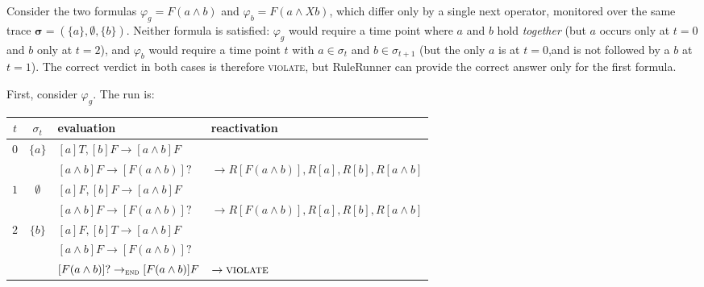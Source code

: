 Consider the two formulas $\varphi_g = F(a \land b)$ and $\varphi_b = F(a \land Xb)$, which differ only by a single next operator, monitored over the same trace $\boldsymbol{\sigma} = (\{a\}, \emptyset, \{b\})$. Neither formula is satisfied: $\varphi_g$ would require a time point where $a$ and $b$ hold \emph{together} (but $a$ occurs only at $t = 0$ and $b$ only at $t = 2$), and $\varphi_b$ would require a time point $t$ with $a \in \sigma_t$ and $b \in \sigma_{t+1}$ (but the only $a$ is at $t = 0$,and is not followed by a $b$ at $t = 1$). The correct verdict in both cases is therefore \textsc{violate}, but RuleRunner can provide the correct answer only for the first formula.

First, consider $\varphi_g$. The run is:
%
\noindent
\begin{center}\small
\begin{tabular}{c c l l}
\toprule
$t$ & $\sigma_t$ & evaluation & reactivation\\
\midrule
\multirow{2}{*}{$0$} & \multirow{2}{*}{$\{a\}$} & $[a]T,[b]F \rightarrow [a \land b]F$ & \\
& & $[a \land b]F \rightarrow [F(a \land b)]?$ & $\rightarrow R[F(a \land b)],R[a],R[b],R[a \land b]$\\[1.5ex]
\multirow{2}{*}{$1$} & \multirow{2}{*}{$\emptyset$} & $[a]F,[b]F \rightarrow [a \land b]F$ & \\
& & $[a \land b]F \rightarrow [F(a \land b)]?$ & $\rightarrow R[F(a \land b)],R[a],R[b],R[a \land b]$\\[1.5ex]
\multirow{3}{*}{$2$} & \multirow{3}{*}{$\{b\}$} & $[a]F,[b]T \rightarrow [a \land b]F$ & \\
& & $[a \land b]F \rightarrow [F(a \land b)]?$ & \\
& & $[F(a \land b)]? \rightarrow_{\textsc{end}} [F(a \land b)]F$ & $\rightarrow \textsc{violate}$ \\
\bottomrule
\end{tabular}
\end{center}

